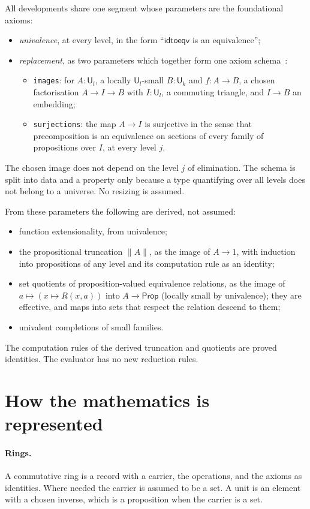 \documentclass[11pt]{article}
\newcommand{\kw}[1]{\texttt{#1}}
\newcommand{\U}{\mathsf{U}}
\newcommand{\tr}[1]{\lVert #1\rVert}
\theoremstyle{remark}
\begin{document}
All developments share one segment whose parameters are the
foundational axioms:
\begin{itemize}
\item \emph{univalence}, at every level, in the form ``$\mathsf{idtoeqv}$
  is an equivalence'';
\item \emph{replacement}, as two parameters which together form one
  axiom schema~\cite[Definitions 2, 4, 6]{CavCoq}:
  \begin{itemize}
  \item \kw{images}: for $A:\U_l$, a locally $\U_l$-small $B:\U_k$ and
    $f : A\to B$, a chosen factorisation
    $A \to I \to B$ with $I:\U_l$, a commuting triangle, and
    $I\to B$ an embedding;
  \item \kw{surjections}: the map $A\to I$ is surjective in the sense
    that precomposition is an equivalence on sections of every family of
    propositions over $I$, at every level $j$.
  \end{itemize}
\end{itemize}
The chosen image does not depend on the level $j$ of elimination. The
schema is split into data and a property only because a type quantifying
over all levels does not belong to a universe. No resizing is assumed.

From these parameters the following are derived, not assumed:
\begin{itemize}
\item function extensionality, from univalence;
\item the propositional truncation $\tr{A}$, as the image of $A\to 1$,
  with induction into propositions of any level and its computation rule
  as an identity;
\item set quotients of proposition-valued equivalence relations, as the
  image of $a \mapsto (x \mapsto R(x,a))$ into $A\to\mathsf{Prop}$
  (locally small by univalence); they are effective, and maps into sets
  that respect the relation descend to them;
\item univalent completions of small families.
\end{itemize}
The computation rules of the derived truncation and quotients are proved
identities. The evaluator has no new reduction rules.

\section{How the mathematics is represented}

\paragraph{Rings.} A commutative ring is a record with a carrier, the
operations, and the axioms as identities. Where needed the carrier is
assumed to be a set. A unit is an element with a chosen inverse, which is
a proposition when the carrier is a set.
\end{document}
